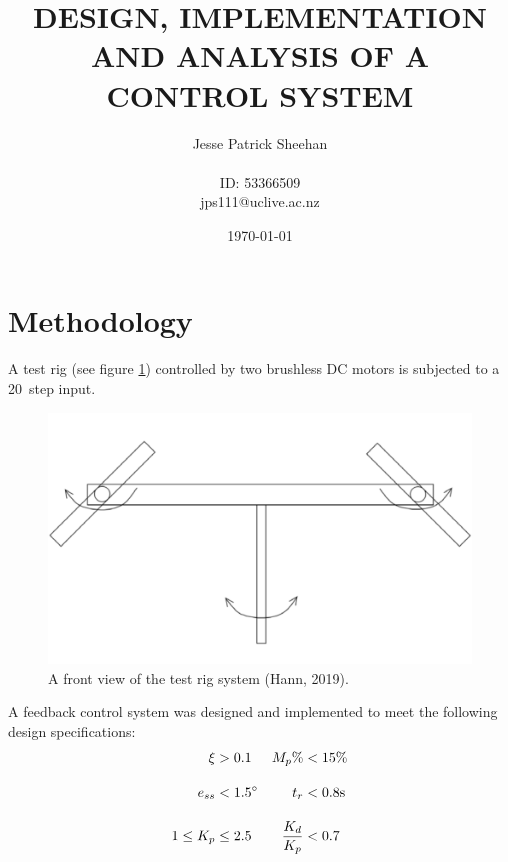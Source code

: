 \documentclass[12pt]{article} %
\title{\uppercase{
	Design, Implementation and Analysis of a Control System
}}
\date{\today}
\author{
	Jesse Patrick Sheehan\\
	\\
	{\small{ID: 53366509}}\\
	{\small{jps111@uclive.ac.nz}}\\
}
\begin{document}
\maketitle

\vfill

\renewcommand{\abstractname}{Executive Summary}

\begin{abstract}


\blindtext

\end{abstract}

\newpage

\section{Methodology}

A test rig (see figure \ref{fig:test-rig}) controlled by two brushless DC motors is subjected to a 20\degree\ step input.

\begin{figure}[H]
	\centering
	\includegraphics[scale=0.8]{test-rig}
	\caption{A front view of the test rig system (Hann, 2019).}
	\label{fig:test-rig}
\end{figure}

\noindent A feedback control system was designed and implemented to meet the following design specifications:
\begin{align*}
\xi &> 0.1 & M_p\% &< 15\%  \\[1em]
e_{ss} &< 1.5\degree & t_r &< 0.8 \textrm{s} \\[1em]
1 \leq K_p &\leq 2.5 & \frac{K_d}{K_p} &< 0.7
\end{align*}
\end{document}
